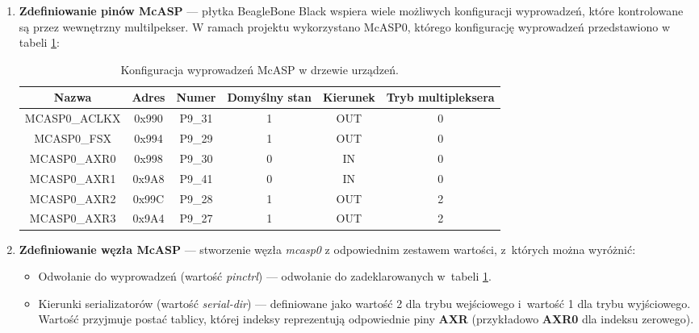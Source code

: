 \begin{enumerate}

    \item \textbf{Zdefiniowanie pinów McASP} --- płytka BeagleBone Black wspiera
    wiele możliwych konfiguracji wyprowadzeń, które kontrolowane są przez
    wewnętrzny multilpekser. W ramach projektu wykorzystano McASP0, którego
    konfigurację wyprowadzeń przedstawiono w tabeli \ref{tab::mcasp}:

    \begin{table}[H]
        \centering
        \begin{adjustbox}{width=1\textwidth}
            \begin{tabular}{|| c | c | c | c | c | c ||} 
            \hline
            \textbf{Nazwa} & \textbf{Adres} & \textbf{Numer} & \textbf{Domyślny
            stan} & \textbf{Kierunek} & \textbf{Tryb multipleksera} \\ [0.5ex]
            \hline\hline
            MCASP0\_ACLKX & 0x990 & P9\_31 & 1 & OUT & 0 \\
            \hline
            MCASP0\_FSX & 0x994 & P9\_29 & 1 & OUT & 0 \\
            \hline
            MCASP0\_AXR0 & 0x998 & P9\_30 & 0 & IN & 0 \\
            \hline
            MCASP0\_AXR1 & 0x9A8 & P9\_41 & 0 & IN & 0 \\
            \hline
            MCASP0\_AXR2 & 0x99C & P9\_28 & 1 & OUT & 2 \\
            \hline
            MCASP0\_AXR3 & 0x9A4 & P9\_27 & 1 & OUT & 2 \\

            \hline\hline
        \end{tabular}
    \end{adjustbox}
    \caption{Konfiguracja wyprowadzeń McASP w drzewie urządzeń.}
    \label{tab::mcasp}

    \end{table}

    \item \textbf{Zdefiniowanie węzła McASP} --- stworzenie węzła
    \textit{mcasp0} z odpowiednim zestawem wartości, z~których można wyróżnić:
    \begin{itemize}

        \item Odwołanie do wyprowadzeń (wartość \textit{pinctrl}) --- odwołanie do
        zadeklarowanych w~tabeli \ref{tab::mcasp}.

        \item Kierunki serializatorów (wartość \textit{serial-dir}) ---
        definiowane jako wartość 2 dla trybu wejściowego i~wartość 1 dla trybu
        wyjściowego. Wartość przyjmuje postać tablicy, której indeksy
        reprezentują odpowiednie piny \textbf{AXR} (przykładowo \textbf{AXR0}
        dla indeksu zerowego).


\end{itemize}
\end{enumerate}
